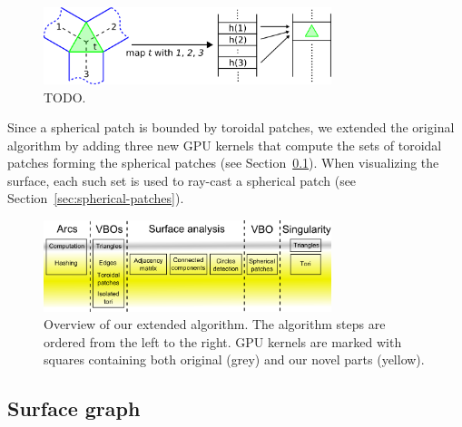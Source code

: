 \begin{figure}[htb]
  \centering
  \includegraphics[width=3.3in]{image/hashing.png}
  \caption{TODO.}
	\label{fig:hashing}
\end{figure}

Since a spherical patch is bounded by toroidal patches, we extended the original algorithm by adding three new GPU kernels that compute the sets of toroidal patches forming the spherical patches (see Section~\ref{sec:graph}).
When visualizing the surface, each such set is used to ray-cast a spherical patch (see Section~\ref{sec:spherical-patches}).

\begin{figure}[htb]
  \centering
  \includegraphics[width=3.3in]{image/kernels.png}
  \caption{Overview of our extended algorithm.
	The algorithm steps are ordered from the left to the right.
	GPU kernels are marked with squares containing both original (grey) and our novel parts (yellow).}
	\label{fig:kernels}
\end{figure}

\subsection{Surface graph}
\label{sec:graph}
   
